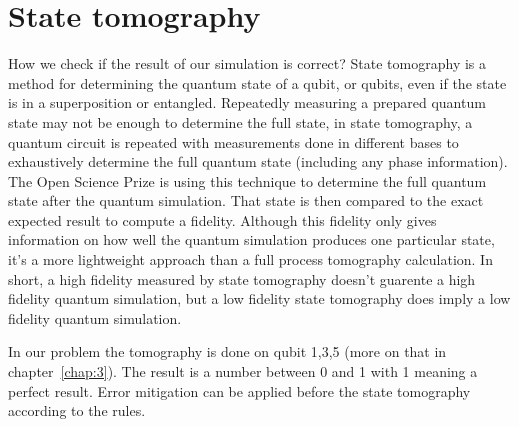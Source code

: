 \section{State tomography}
How we check if the result of our simulation is correct? State tomography is a method for determining the quantum state of a qubit, or qubits, even if the state is in a superposition or entangled. Repeatedly measuring a prepared quantum state may not be enough to determine the full state, in state tomography, a quantum circuit is repeated with measurements done in different bases to exhaustively determine the full quantum state (including any phase information). The Open Science Prize is using this technique to determine the full quantum state after the quantum simulation. That state is then compared to the exact expected result to compute a fidelity. Although this fidelity only gives information on how well the quantum simulation produces one particular state, it's a more lightweight approach than a full process tomography calculation. In short, a high fidelity measured by state tomography doesn't guarente a high fidelity quantum simulation, but a low fidelity state tomography does imply a low fidelity quantum simulation. 

In our problem the tomography is done on qubit 1,3,5 (more on that in chapter~\ref{chap:3}). The result is a number between 0 and 1 with 1 meaning a perfect result. Error mitigation can be
applied before the state tomography according to the rules.~\cite{Tomography}
